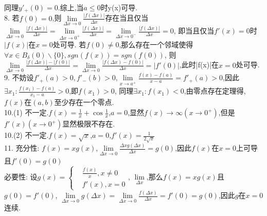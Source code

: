 \documentclass[12pt, a4paper, oneside]{ctexart}
\begin{document}
    同理$y'_+(0)=0$.综上,当$a\leq 0$时y(x)可导.\\
    8. 若$f(0)=0$,则$\lim\limits_{\Delta x\to0}\frac{|f(\Delta x)|}{\Delta x}$存在当且仅当
    $\lim\limits_{\Delta x\to0}\frac{|f(\Delta x)|}{\Delta x}=\lim\limits_{\Delta x\to0^+}\frac{|f(\Delta x)|}{\Delta x}=\lim\limits_{\Delta x\to0^-}\frac{|f(\Delta x)|}{\Delta x}=0$,
    即当且仅当$f'(x)=0$时$|f(x)|$在$x=0$处可导.
    若$f(0)\neq 0$,那么存在一个邻域使得$\forall x\in B_{\delta}(0)\backslash\{0\},sgn(f(x))=sgn(f(0))$,
    则$\lim\limits_{\Delta x\to0}\frac{|f(\Delta x)|-|f(0)|}{\Delta x}=\lim\limits_{\Delta x\to0}\frac{|f(\Delta x)-f(0)|}{\Delta x}=|f'(0)|$,此时|f(x)|在$x=0$处可导.\\
    9. 不妨设$f'_+(a)>0,f'_-(b)>0$,$\lim\limits_{x\to a^+}\frac{f(x)-f(a)}{x-a}=f'_+(a)>0$,因此$\exists x_1:\frac{f(x_1)-f(a)}{x_1-a}>0$,即$f(x_1)>0$,
    同理$\exists x_1:f(x_1)<0$,由零点存在定理得,$f(x)$在$(a,b)$至少存在一个零点.\\
    10.(1) 不一定.$f(x)=\frac1x+\cos \frac1x$,$a=0$,显然$f(x)\to\infty(x\to 0^+)$,但是$f'(x)(x\to 0^+)$显然极限不存在.\\
    10.(2) 不一定.$f(x)=\sqrt{x}$,$a=0$,$f'(x)=\frac{1}{2\sqrt{x}}$\\
    11. 充分性: $f(x)=xg(x)$,$\lim\limits_{\Delta x\to 0}\frac{\Delta xg(\Delta x)}{\Delta x}=g(0)$,因此$f(x)$在$x=0$上可导且$f'(0)=g(0)$\\
    必要性: 设$g(x)=\left\{\begin{aligned}&\frac{f(x)}{x},x\neq 0\\&f'(x),x=0\end{aligned}\right.$, $\lim\limits_{\Delta x}$,那么$f(x)=xg(x)$且$g(0)=f'(0)$,
    $\lim\limits_{\Delta x\to 0}g(\Delta x)=\lim\limits_{\Delta x\to 0}\frac{f(\Delta x)}{\Delta x}=f'(0)=g(0)$,因此$g$在$x=0$连续.\\
    
\end{document}
